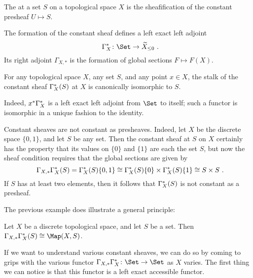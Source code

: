 \begin{dfn}
	The  at a set $ S $ on a topological space $ X $ is the sheafification of the constant presheaf $ U \mapsto S $.
\end{dfn}

\begin{nul}
	The formation of the constant sheaf defines a left exact left adjoint
	\[
		\Gammaupperstar_X \colon \Set \to \widetilde{X}_{\leq 0} \period
	\]
	Its right adjoint $ \Gamma_{X, \ast} $ is the formation of global sections $ F \mapsto F(X) $.
\end{nul}

\begin{nul}
	For any topological space $ X $, any set $ S $, and any point $ x \in X $, the stalk of the constant sheaf $ \Gamma^{\ast}_X (S) $ at $ X $ is canonically isomorphic to $ S $.

	Indeed, $ x^{\ast} \Gamma^{\ast}_X $ is a left exact left adjoint from $ \Set $ to itself;
	such a functor is isomorphic in a unique fashion to the identity.
\end{nul}

\begin{exm}
	Constant sheaves are not constant as presheaves.
	Indeed, let $ X $ be the discrete space $ \{ 0, 1 \} $, and let $ S $ be any set.
	Then the constant sheaf at $ S $ on $ X $ certainly has the property that its values on $ \{ 0 \} $ and $ \{ 1 \} $ are each the set $ S $, but now the sheaf condition requires that the global sections are given by
	\[
		\Gamma_{X, \ast} \Gammaupperstar_X (S) = \Gammaupperstar_X (S) \{0,1\} \cong \Gammaupperstar_X (S) \{ 0 \} \times \Gammaupperstar_X (S) \{ 1 \} \cong S \times S \period
	\]
	If $ S $ has at least two elements, then it follows that $ \Gamma^{\ast}_X (S) $ is not constant as a presheaf.
\end{exm}

The previous example does illustrate a general principle:

\begin{lem}
	Let $ X $ be a discrete topological space, and let $ S $ be a set.
	Then $ \Gamma_{X, \ast} \Gammaupperstar_X ( S ) \cong \Map(X, S ) $. 
\end{lem}

If we want to understand various constant sheaves, we can do so by coming to grips with the various functor $ \Gamma_{X, \ast} \Gammaupperstar_X \colon \Set \to \Set $ as $ X $ varies.
The first thing we can notice is that this functor is a left exact accessible functor.

